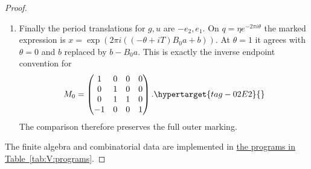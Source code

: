 \documentclass[11pt,a4paper]{article}
\numberwithin{equation}{section}
\theoremstyle{definition}
\begin{document}
\begin{proof}
\begin{enumerate}[label=\arabic*.,leftmargin=*]
\item Finally the period translations for $g,u$ are $-e_2,e_1$.
On $q=\eta e^{-2\pi i\theta}$ the marked expression is
$x=\exp(2\pi i((-\theta+iT)B_0a+b))$.
At $\theta=1$ it agrees with $\theta=0$ and
$b$ replaced by $b-B_0a$.  This is exactly the inverse
endpoint convention for
\begin{equation}
 M_0=\begin{pmatrix}
 1&0&0&0\\0&1&0&0\\0&1&1&0\\-1&0&0&1
 \end{pmatrix}.
 \hypertarget{tag-02E2}{}\label{maps:eq:E.T8}
\end{equation}
The comparison therefore preserves the full outer marking.

\end{enumerate}
The finite algebra and combinatorial data are implemented in \hyperlink{prog:V:framings}{the programs in Table~\ref*{tab:V:programs}}.
\end{proof}
\end{document}
